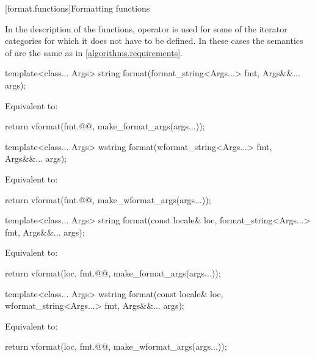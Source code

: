 [format.functions]{Formatting functions}

\pnum
In the description of the functions, operator \tcode{+} is used
for some of the iterator categories for which it does not have to be defined.
In these cases the semantics of  are
the same as in \ref{algorithms.requirements}.

%
\begin{itemdecl}
template<class... Args>
  string format(format_string<Args...> fmt, Args&&... args);
\end{itemdecl}

\begin{itemdescr}
\pnum
\effects
Equivalent to:
\begin{codeblock}
return vformat(fmt.@@, make_format_args(args...));
\end{codeblock}
\end{itemdescr}

%
\begin{itemdecl}
template<class... Args>
  wstring format(wformat_string<Args...> fmt, Args&&... args);
\end{itemdecl}

\begin{itemdescr}
\pnum
\effects
Equivalent to:
\begin{codeblock}
return vformat(fmt.@@, make_wformat_args(args...));
\end{codeblock}
\end{itemdescr}

%
\begin{itemdecl}
template<class... Args>
  string format(const locale& loc, format_string<Args...> fmt, Args&&... args);
\end{itemdecl}

\begin{itemdescr}
\pnum
\effects
Equivalent to:
\begin{codeblock}
return vformat(loc, fmt.@@, make_format_args(args...));
\end{codeblock}
\end{itemdescr}

%
\begin{itemdecl}
template<class... Args>
  wstring format(const locale& loc, wformat_string<Args...> fmt, Args&&... args);
\end{itemdecl}

\begin{itemdescr}
\pnum
\effects
Equivalent to:
\begin{codeblock}
return vformat(loc, fmt.@@, make_wformat_args(args...));
\end{codeblock}
\end{itemdescr}

